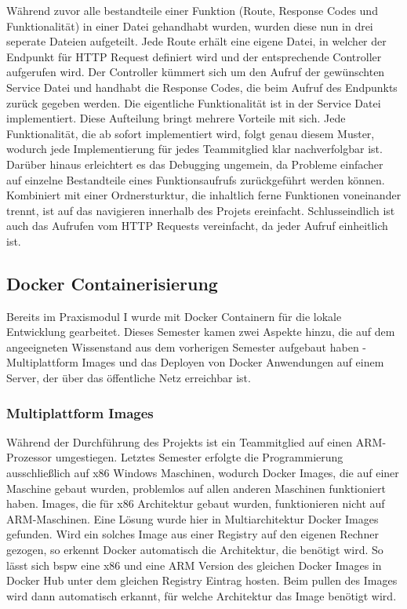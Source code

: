 Während zuvor alle bestandteile einer Funktion (Route, Response Codes und Funktionalität) in einer Datei gehandhabt wurden, wurden diese nun in drei seperate Dateien aufgeteilt.
Jede Route erhält eine eigene Datei, in welcher der Endpunkt für HTTP Request definiert wird und der entsprechende Controller aufgerufen wird.
Der Controller kümmert sich um den Aufruf der gewünschten Service Datei und handhabt die Response Codes, die beim Aufruf des Endpunkts zurück gegeben werden.
Die eigentliche Funktionalität ist in der Service Datei implementiert.
Diese Aufteilung bringt mehrere Vorteile mit sich.
Jede Funktionalität, die ab sofort implementiert wird, folgt genau diesem Muster, wodurch jede Implementierung für jedes Teammitglied klar nachverfolgbar ist.
Darüber hinaus erleichtert es das Debugging ungemein, da Probleme einfacher auf einzelne Bestandteile eines Funktionsaufrufs zurückgeführt werden können.
Kombiniert mit einer Ordnersturktur, die inhaltlich ferne Funktionen voneinander trennt, ist auf das navigieren innerhalb des Projets ereinfacht.
Schlusseindlich ist auch das Aufrufen vom HTTP Requests vereinfacht, da jeder Aufruf einheitlich ist.

\subsection{Docker Containerisierung}\label{subsec:docker-containerisierung}

Bereits im Praxismodul I wurde mit Docker Containern für die lokale Entwicklung gearbeitet.
Dieses Semester kamen zwei Aspekte hinzu, die auf dem angeeigneten Wissenstand aus dem vorherigen Semester aufgebaut haben - Multiplattform Images und das Deployen von Docker Anwendungen auf einem Server, der über das öffentliche Netz erreichbar ist.

\subsubsection{Multiplattform Images}\label{subsubsec:multiplattform-images}
Während der Durchführung des Projekts ist ein Teammitglied auf einen ARM-Prozessor umgestiegen.
Letztes Semester erfolgte die Programmierung ausschließlich auf x86 Windows Maschinen, wodurch Docker Images, die auf einer Maschine gebaut wurden, problemlos auf allen anderen Maschinen funktioniert haben.
Images, die für x86 Architektur gebaut wurden, funktionieren nicht auf ARM-Maschinen.
Eine Lösung wurde hier in Multiarchitektur Docker Images gefunden.
Wird ein solches Image aus einer Registry auf den eigenen Rechner gezogen, so erkennt Docker automatisch die Architektur, die benötigt wird.
So lässt sich bspw eine x86 und eine ARM Version des gleichen Docker Images in Docker Hub unter dem gleichen Registry Eintrag hosten.
Beim pullen des Images wird dann automatisch erkannt, für welche Architektur das Image benötigt wird.

